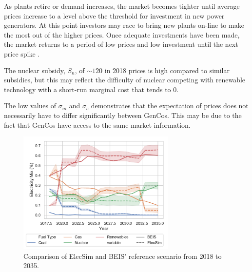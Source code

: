 As plants retire or demand increases, the market becomes tighter until average prices increase to a level above the threshold for investment in new power generators. At this point investors may race to bring new plants on-line to make the most out of the higher prices. Once adequate investments have been made, the market returns to a period of low prices and low investment until the next price spike \cite{Gross2007}. 


The nuclear subsidy, $S_n$, of ${\sim}$\textsterling $120$ in 2018 prices is high compared to similar subsidies, but this may reflect the difficulty of nuclear competing with renewable technology with a short-run marginal cost that tends to \textsterling $0$.

The low values of $\sigma_m$ and $\sigma_c$ demonstrates that the expectation of prices does not necessarily have to differ significantly between GenCos. This may be due to the fact that GenCos have access to the same market information.


\begin{figure}
	\centering
	\includegraphics[width=0.7\textwidth]{Chapter4/figures/e-Energy-2020/results/scenario_analysis/best_forward_scenario_below_legend.pdf}
	\caption{Comparison of ElecSim and BEIS' reference scenario from 2018 to 2035.}
	\label{fig:forward_scenario_beis_elecsim}
\end{figure}


